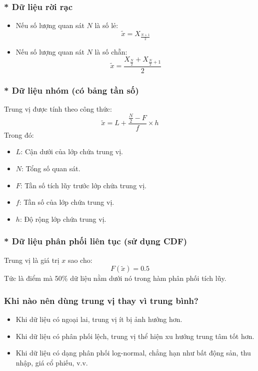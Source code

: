 \subsubsection{* Dữ liệu rời rạc}
\begin{itemize}
    \item Nếu số lượng quan sát $N$ là số lẻ:
    \[
    \tilde{x} = X_{\frac{N+1}{2}}
    \]
    \item Nếu số lượng quan sát $N$ là số chẵn:
    \[
    \tilde{x} = \frac{X_{\frac{N}{2}} + X_{\frac{N}{2} + 1}}{2}
    \]
\end{itemize}

\subsubsection{* Dữ liệu nhóm (có bảng tần số)}
Trung vị được tính theo công thức:
\[
\tilde{x} = L + \frac{\frac{N}{2} - F}{f} \times h
\]
Trong đó:
\begin{itemize}
    \item $L$: Cận dưới của lớp chứa trung vị.
    \item $N$: Tổng số quan sát.
    \item $F$: Tần số tích lũy trước lớp chứa trung vị.
    \item $f$: Tần số của lớp chứa trung vị.
    \item $h$: Độ rộng lớp chứa trung vị.
\end{itemize}

\subsubsection{* Dữ liệu phân phối liên tục (sử dụng CDF)}
Trung vị là giá trị $x$ sao cho:
\[
F(\tilde{x}) = 0.5
\]
Tức là điểm mà 50\% dữ liệu nằm dưới nó trong hàm phân phối tích lũy.



\subsubsection{Khi nào nên dùng trung vị thay vì trung bình?}
\begin{itemize}
    \item Khi dữ liệu có ngoại lai, trung vị ít bị ảnh hưởng hơn.
    \item Khi dữ liệu có phân phối lệch, trung vị thể hiện xu hướng trung tâm tốt hơn.
    \item Khi dữ liệu có dạng phân phối log-normal, chẳng hạn như bất động sản, thu nhập, giá cổ phiếu, v.v.
\end{itemize}



